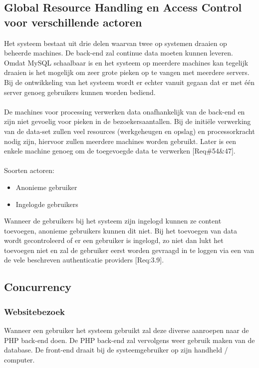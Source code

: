 \documentclass[a4paper,10pt]{article}
\begin{document}
	\subsection{Global Resource Handling en Access Control voor verschillende actoren}
	Het systeem bestaat uit drie delen waarvan twee op systemen draaien op beheerde machines. De back-end zal continue data moeten kunnen leveren. Omdat MySQL schaalbaar is en het systeem op meerdere machines kan tegelijk draaien is het mogelijk om zeer grote pieken op te vangen met meerdere servers. Bij de ontwikkeling van het systeem wordt er echter vanuit gegaan dat er met \'e\'en server genoeg gebruikers kunnen worden bediend.\\ \\
De machines voor processing verwerken data onafhankelijk van de back-end en zijn niet gevoelig voor pieken in de bezoekersaantallen. Bij de initi\"ele verwerking van de data-set zullen veel resources (werkgeheugen en opslag) en processorkracht nodig zijn, hiervoor zullen meerdere machines worden gebruikt. Later is een enkele machine genoeg om de toegevoegde data te verwerken [Req\#54\&47].\\ \\
Soorten actoren:
	\begin{itemize}
		\item Anonieme gebruiker
		\item Ingelogde gebruikers
	\end{itemize}

Wanneer de gebruikers bij het systeem zijn ingelogd kunnen ze content toevoegen, anonieme gebruikers kunnen dit niet. Bij het toevoegen van data wordt gecontroleerd of er een gebruiker is ingelogd, zo niet dan lukt het toevoegen niet en zal de gebruiker eerst worden gevraagd in te loggen via een van de vele beschreven authenticatie providers [Req:3.9].

	\subsection{Concurrency}
		\subsubsection{Websitebezoek}
		Wanneer een gebruiker het systeem gebruikt zal deze diverse aanroepen naar de PHP back-end doen. De PHP back-end zal vervolgens weer gebruik maken van de database. De front-end draait bij de systeemgebruiker op zijn handheld / computer.
		
\end{document}
